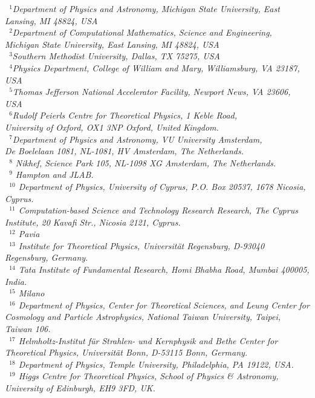 \documentclass[11pt,a4paper]{article}
\numberwithin{equation}{section}
\numberwithin{figure}{section}
\numberwithin{table}{section}
\begin{document}
\begin{center}
\vspace{.2cm}
{\it \small
~$^{1}$Department of Physics and Astronomy, Michigan State University, East Lansing, MI 48824, USA\\
~$^{2}$Department of Computational Mathematics, Science and Engineering, \\Michigan State University, East Lansing, MI 48824, USA\\
~$^{3}$Southern Methodist University, Dallas, TX 75275, USA\\
~$^{4}$Physics Department, College of William and Mary, Williamsburg, VA 23187, USA\\
~$^{5}$Thomas Jefferson National Accelerator Facility, Newport News, VA 23606, USA\\
~$^6$Rudolf Peierls Centre for Theoretical Physics, 1 Keble Road,\\ University of Oxford, OX1 3NP Oxford, United Kingdom.\\
~$^{7}$Department of Physics and Astronomy, VU University Amsterdam,\\
De Boelelaan 1081, NL-1081, HV Amsterdam, The Netherlands.\\
~$^{8}$ Nikhef, Science Park 105, NL-1098 XG Amsterdam, The Netherlands.\\
~$^{9}$ Hampton and JLAB. \\
~$^{10}$ Department of Physics, University of Cyprus, P.O. Box 20537, 1678 Nicosia, Cyprus. \\
~$^{11}$ Computation-based Science and Technology Research Research, The Cyprus Institute, 20
Kavafi Str., Nicosia 2121, Cyprus. \\
~$^{12}$ Pavia \\
~$^{13}$ Institute for Theoretical Physics, Universit\"at Regensburg, D-93040 Regensburg, Germany. \\
~$^{14}$ Tata Institute of Fundamental Research, Homi Bhabha Road, Mumbai 400005, India. \\
~$^{15}$ Milano \\
~$^{16}$ Department of Physics, Center for Theoretical Sciences,
and Leung Center for Cosmology and Particle Astrophysics,
National Taiwan University, Taipei, Taiwan 106. \\
~$^{17}$ Helmholtz-Institut f\"ur Strahlen- und Kernphysik and Bethe Center
for Theoretical Physics, Universit\"at Bonn, D-53115 Bonn, Germany. \\
~$^{18}$ Department of Physics, Temple University, Philadelphia, PA 19122, USA. \\
~$^{19}$ Higgs Centre for Theoretical Physics, School of Physics & Astronomy, University of Edinburgh, EH9 3FD, UK. \\
}
\end{center}
\end{document}
